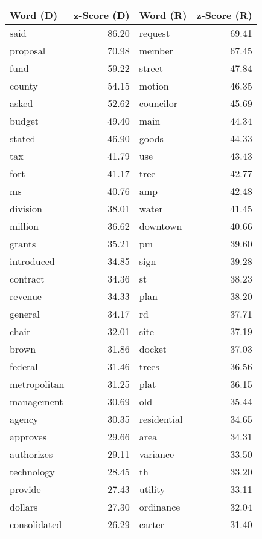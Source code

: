 \begin{table}[ht]
\centering
\begingroup\fontsize{9pt}{10pt}\selectfont
\begin{tabular}{lrlr}
  \hline
Word (D) & z-Score (D) & Word (R) & z-Score (R) \\ 
  \hline
said & 86.20 & request & 69.41 \\ 
  proposal & 70.98 & member & 67.45 \\ 
  fund & 59.22 & street & 47.84 \\ 
  county & 54.15 & motion & 46.35 \\ 
  asked & 52.62 & councilor & 45.69 \\ 
  budget & 49.40 & main & 44.34 \\ 
  stated & 46.90 & goods & 44.33 \\ 
  tax & 41.79 & use & 43.43 \\ 
  fort & 41.17 & tree & 42.77 \\ 
  ms & 40.76 & amp & 42.48 \\ 
  division & 38.01 & water & 41.45 \\ 
  million & 36.62 & downtown & 40.66 \\ 
  grants & 35.21 & pm & 39.60 \\ 
  introduced & 34.85 & sign & 39.28 \\ 
  contract & 34.36 & st & 38.23 \\ 
  revenue & 34.33 & plan & 38.20 \\ 
  general & 34.17 & rd & 37.71 \\ 
  chair & 32.01 & site & 37.19 \\ 
  brown & 31.86 & docket & 37.03 \\ 
  federal & 31.46 & trees & 36.56 \\ 
  metropolitan & 31.25 & plat & 36.15 \\ 
  management & 30.69 & old & 35.44 \\ 
  agency & 30.35 & residential & 34.65 \\ 
  approves & 29.66 & area & 34.31 \\ 
  authorizes & 29.11 & variance & 33.50 \\ 
  technology & 28.45 & th & 33.20 \\ 
  provide & 27.43 & utility & 33.11 \\ 
  dollars & 27.30 & ordinance & 32.04 \\ 
  consolidated & 26.29 & carter & 31.40 \\ 

\end{tabular}
\end{table}
